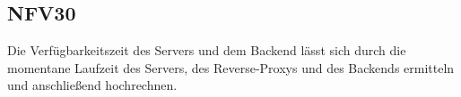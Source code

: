 \subsection*{NFV30}

Die Verfügbarkeitszeit des \Gls{Server}s und dem \Gls{Backend} lässt sich durch die momentane Laufzeit des \Gls{Server}s,
des \Gls{Reverse-Proxy}s und des \Gls{Backend}s ermitteln und anschließend hochrechnen.